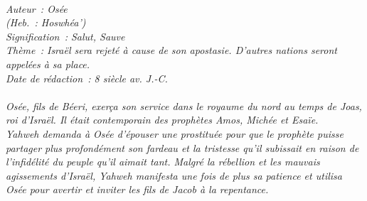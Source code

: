 \BFont
\noindent\hrulefill
{\footnotesize
\textit{
\bigskip
{\centering{}
\\Auteur~: Osée
\\(Heb.~: Hoswhéa')
\\Signification~: Salut, Sauve
\\Thème~: Israël sera rejeté à cause de son apostasie. D'autres nations seront appelées à sa place.
\\Date de rédaction~: 8 siècle av. J.-C.\\}
}
\textit{
\\Osée, fils de Béeri, exerça son service dans le royaume du nord au temps de Joas, roi d'Israël. Il était contemporain des prophètes Amos, Michée et Esaïe.
\\Yahweh demanda à Osée d'épouser une prostituée pour que le prophète puisse partager plus profondément son fardeau et la tristesse qu'il subissait en raison de l'infidélité du peuple qu'il aimait tant. Malgré la rébellion et les mauvais agissements d'Israël, Yahweh manifesta une fois de plus sa patience et utilisa Osée pour avertir et inviter les fils de Jacob à la repentance.\bigskip
}
}
\par\nobreak\noindent\hrulefill

